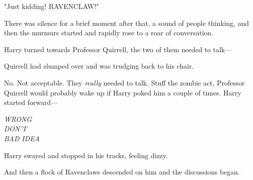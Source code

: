 "Just kidding! RAVENCLAW!"

There was silence for a brief moment after that, a sound of people thinking, 
and then the murmurs started and rapidly rose to a roar of conversation.

Harry turned towards Professor Quirrell, the two of them needed to talk---

Quirrell had slumped over and was trudging back to his chair.

No. Not acceptable. They \emph{really} needed to talk. Stuff the zombie act, 
Professor Quirrell would probably wake up if Harry poked him a couple of times. 
Harry started forward---

\emph{WRONG\\
DON'T\\
BAD IDEA}

Harry swayed and stopped in his tracks, feeling dizzy.

And then a flock of Ravenclaws descended on him and the discussions began.